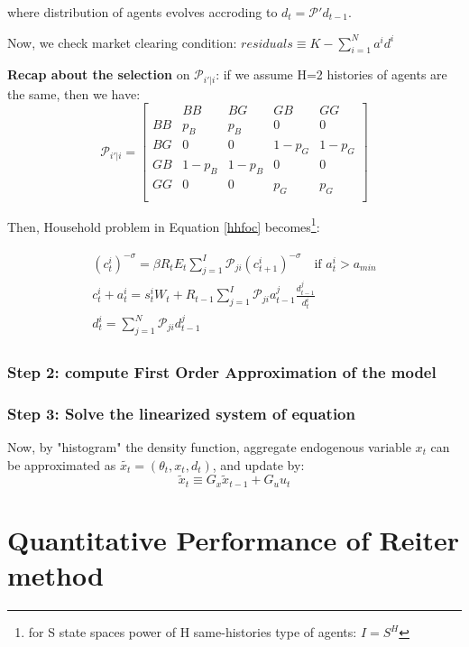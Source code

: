 where distribution of agents evolves accroding to $d_t = \mathcal{P'} d_{t-1}$. 

Now, we check market clearing condition: $residuals \equiv K - \sum_{i=1}^{N}a^i d^i$

\textbf{Recap about the selection} on $\mathcal{P}_{i'|i}$: if we assume H=2 histories of agents are the same, then we have: 
\[ 
\mathcal{P}_{i'|i}=
\begin{bmatrix}
& BB & BG & GB & GG \\
BB & p_B & p_B & 0 & 0\\ 
BG & 0 & 0 & 1-p_G & 1-p_G\\
GB & 1-p_B & 1-p_B & 0 & 0\\
GG & 0 & 0 & p_G & p_G\\
\end{bmatrix}
\]

Then, Household problem in Equation \ref{hhfoc} becomes\footnote{for S state spaces power of H same-histories type of agents: $I = S^H$}: 

\begin{align}
\begin{split}
(c^i_t)^{-\sigma} = \beta R_t E_t \sum_{j=1}^I \mathcal{P}_{ji} (c^i_{t+1})^{-\sigma} \quad \text{if } a^i_t > a_{min} \\
c^i_t + a^i_t = s^i_t W_t + R_{t-1} \sum_{j=1}^I \mathcal{P}_{ji} a^j_{t-1} \frac{d^j_{t-1}}{d^i_t} \\
d^i_t = \sum_{j=1}^N \mathcal{P}_{ji} d^j_{t-1}
\end{split}
\end{align}

\subsubsection*{Step 2: compute First Order Approximation of the model}

\subsubsection*{Step 3: Solve the linearized system of equation }
Now, by "histogram" the density function, aggregate endogenous variable $x_t$ can be approximated  as $\tilde{x_t} = (\theta_t, x_t, d_t)$, and update by:
\[ \tilde{x}_t \equiv G_x \tilde{x}_{t-1} + G_u u_t\]

\newpage


\section{Quantitative Performance of Reiter method}

